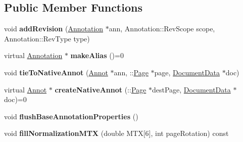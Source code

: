 \subsection*{Public Member Functions}
\begin{DoxyCompactItemize}
\item 
\mbox{\label{class_poppler_1_1_annotation_private_aa12919a8eefdd9cb59e1e60b05c20e09}} 
void {\bfseries add\+Revision} (\hyperlink{class_poppler_1_1_annotation}{Annotation} $\ast$ann, Annotation\+::\+Rev\+Scope scope, Annotation\+::\+Rev\+Type type)
\item 
\mbox{\label{class_poppler_1_1_annotation_private_ae42f7474787ae281d8f6c2164b6cbb36}} 
virtual \hyperlink{class_poppler_1_1_annotation}{Annotation} $\ast$ {\bfseries make\+Alias} ()=0
\item 
\mbox{\label{class_poppler_1_1_annotation_private_a013b4fe35fb28ec316d98cb0c64ccadf}} 
void {\bfseries tie\+To\+Native\+Annot} (\hyperlink{class_annot}{Annot} $\ast$ann, \+::\hyperlink{class_poppler_1_1_page}{Page} $\ast$page, \hyperlink{class_poppler_1_1_document_data}{Document\+Data} $\ast$doc)
\item 
\mbox{\label{class_poppler_1_1_annotation_private_a51fc2507eae2f1821c785883612a4b08}} 
virtual \hyperlink{class_annot}{Annot} $\ast$ {\bfseries create\+Native\+Annot} (\+::\hyperlink{class_poppler_1_1_page}{Page} $\ast$dest\+Page, \hyperlink{class_poppler_1_1_document_data}{Document\+Data} $\ast$doc)=0
\item 
\mbox{\label{class_poppler_1_1_annotation_private_a2b21bec4b6a12801ce0a6610a574145f}} 
void {\bfseries flush\+Base\+Annotation\+Properties} ()
\item 
\mbox{\label{class_poppler_1_1_annotation_private_a201d592fe540bea7e74d4f7cd0a16ab2}} 
void {\bfseries fill\+Normalization\+M\+TX} (double M\+TX\mbox{[}6\mbox{]}, int page\+Rotation) const
\item 
\mbox{\label{class_poppler_1_1_annotation_private_a9372afa55736037ea363d8f3b49e57ee}} 

\end{DoxyCompactItemize}
